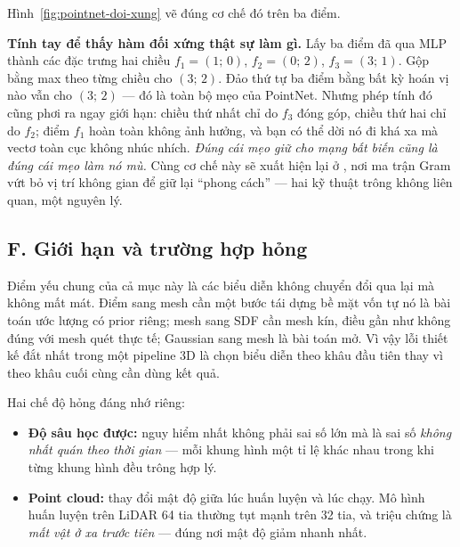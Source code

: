 \documentclass[../../../deep_learning.tex]{subfiles}
\begin{document}
Hình~\ref{fig:pointnet-doi-xung} vẽ đúng cơ chế đó trên ba điểm.

\textbf{Tính tay để thấy hàm đối xứng thật sự làm gì.} Lấy ba điểm đã qua MLP thành các đặc trưng hai chiều \(f_1=(1;\,0)\), \(f_2=(0;\,2)\), \(f_3=(3;\,1)\). Gộp bằng max theo từng chiều cho \((3;\,2)\). Đảo thứ tự ba điểm bằng bất kỳ hoán vị nào vẫn cho \((3;\,2)\) --- đó là toàn bộ mẹo của PointNet. Nhưng phép tính đó cũng phơi ra ngay giới hạn: chiều thứ nhất chỉ do \(f_3\) đóng góp, chiều thứ hai chỉ do \(f_2\); điểm \(f_1\) hoàn toàn không ảnh hưởng, và bạn có thể dời nó đi khá xa mà vectơ toàn cục không nhúc nhích. \emph{Đúng cái mẹo giữ cho mạng bất biến cũng là đúng cái mẹo làm nó mù.} Cùng cơ chế này sẽ xuất hiện lại ở , nơi ma trận Gram vứt bỏ vị trí không gian để giữ lại ``phong cách'' --- hai kỹ thuật trông không liên quan, một nguyên lý.

\subsection{F. Giới hạn và trường hợp hỏng}
Điểm yếu chung của cả mục này là các biểu diễn không chuyển đổi qua lại mà không mất mát. Điểm sang mesh cần một bước tái dựng bề mặt vốn tự nó là bài toán ước lượng có prior riêng; mesh sang SDF cần mesh kín, điều gần như không đúng với mesh quét thực tế; Gaussian sang mesh là bài toán mở. Vì vậy lỗi thiết kế đắt nhất trong một pipeline 3D là chọn biểu diễn theo khâu đầu tiên thay vì theo khâu cuối cùng cần dùng kết quả.

Hai chế độ hỏng đáng nhớ riêng:
\begin{itemize}
\item \textbf{Độ sâu học được:} nguy hiểm nhất không phải sai số lớn mà là sai số \emph{không nhất quán theo thời gian} --- mỗi khung hình một tỉ lệ khác nhau trong khi từng khung hình đều trông hợp lý.
\item \textbf{Point cloud:} thay đổi mật độ giữa lúc huấn luyện và lúc chạy. Mô hình huấn luyện trên LiDAR 64 tia thường tụt mạnh trên 32 tia, và triệu chứng là \emph{mất vật ở xa trước tiên} --- đúng nơi mật độ giảm nhanh nhất.
\end{itemize}
\end{document}

